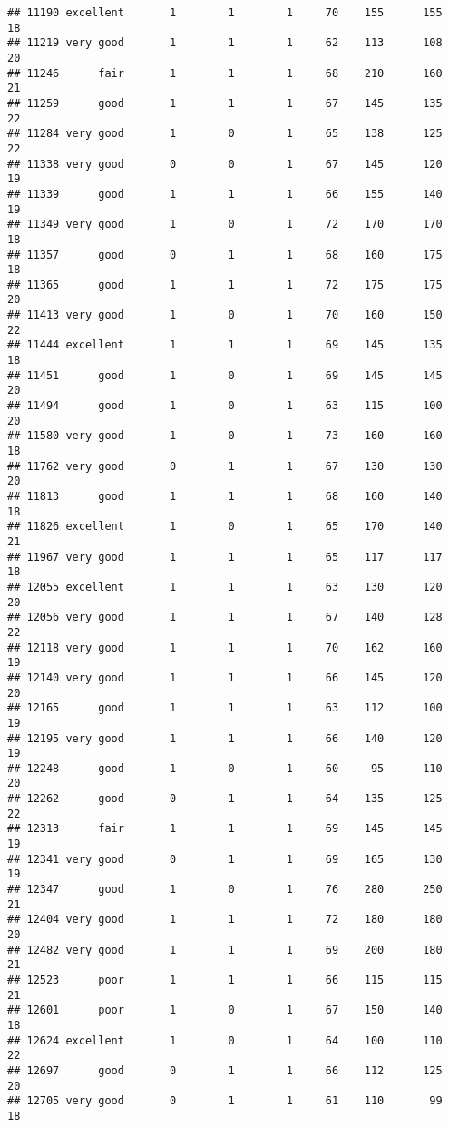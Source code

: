 \documentclass[]{article}
\begin{document}
\begin{verbatim}
## 11190 excellent       1        1        1     70    155      155  18
## 11219 very good       1        1        1     62    113      108  20
## 11246      fair       1        1        1     68    210      160  21
## 11259      good       1        1        1     67    145      135  22
## 11284 very good       1        0        1     65    138      125  22
## 11338 very good       0        0        1     67    145      120  19
## 11339      good       1        1        1     66    155      140  19
## 11349 very good       1        0        1     72    170      170  18
## 11357      good       0        1        1     68    160      175  18
## 11365      good       1        1        1     72    175      175  20
## 11413 very good       1        0        1     70    160      150  22
## 11444 excellent       1        1        1     69    145      135  18
## 11451      good       1        0        1     69    145      145  20
## 11494      good       1        0        1     63    115      100  20
## 11580 very good       1        0        1     73    160      160  18
## 11762 very good       0        1        1     67    130      130  20
## 11813      good       1        1        1     68    160      140  18
## 11826 excellent       1        0        1     65    170      140  21
## 11967 very good       1        1        1     65    117      117  18
## 12055 excellent       1        1        1     63    130      120  20
## 12056 very good       1        1        1     67    140      128  22
## 12118 very good       1        1        1     70    162      160  19
## 12140 very good       1        1        1     66    145      120  20
## 12165      good       1        1        1     63    112      100  19
## 12195 very good       1        1        1     66    140      120  19
## 12248      good       1        0        1     60     95      110  20
## 12262      good       0        1        1     64    135      125  22
## 12313      fair       1        1        1     69    145      145  19
## 12341 very good       0        1        1     69    165      130  19
## 12347      good       1        0        1     76    280      250  21
## 12404 very good       1        1        1     72    180      180  20
## 12482 very good       1        1        1     69    200      180  21
## 12523      poor       1        1        1     66    115      115  21
## 12601      poor       1        0        1     67    150      140  18
## 12624 excellent       1        0        1     64    100      110  22
## 12697      good       0        1        1     66    112      125  20
## 12705 very good       0        1        1     61    110       99  18

\end{verbatim}
\end{document}
